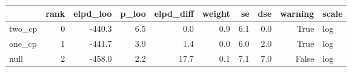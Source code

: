 \begin{tabular}{lrrrrrrrrl}
\toprule
 & rank & elpd_loo & p_loo & elpd_diff & weight & se & dse & warning & scale \\
\midrule
two_cp & 0 & -440.3 & 6.5 & 0.0 & 0.9 & 6.1 & 0.0 & True & log \\
one_cp & 1 & -441.7 & 3.9 & 1.4 & 0.0 & 6.0 & 2.0 & True & log \\
null & 2 & -458.0 & 2.2 & 17.7 & 0.1 & 7.1 & 7.0 & False & log \\
\bottomrule
\end{tabular}

